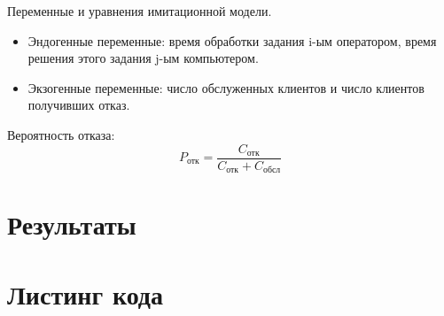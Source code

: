 Переменные и уравнения имитационной модели.

\begin{itemize}
    \item Эндогенные переменные: время обработки задания i-ым оператором, время решения этого задания j-ым компьютером.
    \item Экзогенные переменные: число обслуженных клиентов и число клиентов получивших отказ.
\end{itemize}


Вероятность отказа:
\begin{equation*}
    P_{\text{отк}} = \frac{C_{\text{отк}}}{C_{\text{отк}} + C_{\text{обсл}}}
\end{equation*}

\section{Результаты}

\begin{figure}[h!]
    \centering
\end{figure}

\pagebreak
\section{Листинг кода}




\pagebreak
{}

